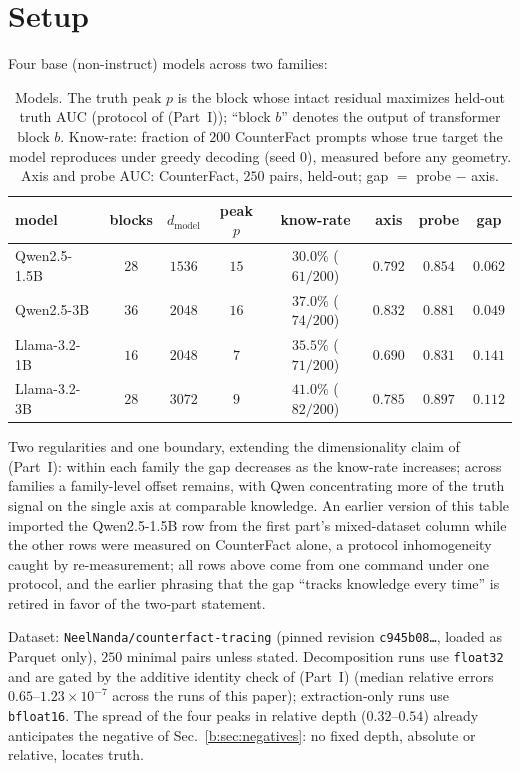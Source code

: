 \documentclass[11pt]{article}
\begin{document}
\section{Setup}
\label{b:sec:setup}

Four base (non-instruct) models across two families:

\begin{table}[H]
\centering
\caption{Models. The truth peak $p$ is the block whose intact residual
maximizes held-out truth AUC (protocol of (Part~I)); ``block $b$''
denotes the output of transformer block $b$. Know-rate: fraction of $200$
CounterFact prompts whose true target the model reproduces under greedy
decoding (seed $0$), measured before any geometry. Axis and probe AUC:
CounterFact, $250$ pairs, held-out; gap $=$ probe $-$ axis.}
\label{b:tab:models}
\begin{tabular}{lccccccc}
\toprule
model & blocks & $d_{\mathrm{model}}$ & peak $p$ & know-rate & axis & probe & gap \\
\midrule
Qwen2.5-1.5B  & $28$ & $1536$ & $15$ & $30.0\%$ ($61/200$) & $0.792$ & $0.854$ & $0.062$ \\
Qwen2.5-3B    & $36$ & $2048$ & $16$ & $37.0\%$ ($74/200$) & $0.832$ & $0.881$ & $0.049$ \\
Llama-3.2-1B  & $16$ & $2048$ & $7$  & $35.5\%$ ($71/200$) & $0.690$ & $0.831$ & $0.141$ \\
Llama-3.2-3B  & $28$ & $3072$ & $9$  & $41.0\%$ ($82/200$) & $0.785$ & $0.897$ & $0.112$ \\
\bottomrule
\end{tabular}
\end{table}

Two regularities and one boundary, extending the dimensionality claim
of (Part~I): within each family the gap decreases as the know-rate
increases; across families a family-level offset remains, with Qwen
concentrating more of the truth signal on the single axis at comparable
knowledge. An earlier version of this table imported the Qwen2.5-1.5B row
from the first part's mixed-dataset column while the other rows were
measured on CounterFact alone, a protocol inhomogeneity caught by
re-measurement; all rows above come from one command under one protocol,
and the earlier phrasing that the gap ``tracks knowledge every time'' is
retired in favor of the two-part statement.

Dataset: \texttt{NeelNanda/counterfact-tracing} (pinned revision
\texttt{c945b08\ldots}, loaded as Parquet only), $250$ minimal pairs unless
stated. Decomposition runs use \texttt{float32} and are gated by the
additive identity check of (Part~I) (median relative errors
$0.65$--$1.23 \times 10^{-7}$ across the runs of this paper);
extraction-only runs use \texttt{bfloat16}. The spread of the four peaks in
relative depth ($0.32$--$0.54$) already anticipates the negative of
Sec.~\ref{b:sec:negatives}: no fixed depth, absolute or relative, locates
truth.
\end{document}
